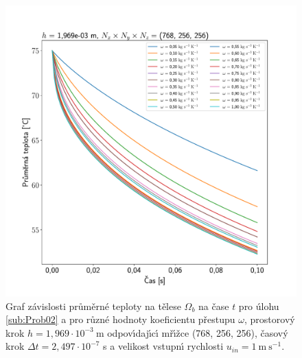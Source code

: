         
        \begin{figure}[H]
            \centering
            \includegraphics[width=.95\linewidth, clip, trim=1.45cm 0.95cm 2cm 1.7cm]{Img/Kapitola 3/Problem02_all_transfers.pdf}
            \caption{Graf z\'{a}vislosti pr\r{u}m\v{e}rn\'{e} teploty na t\v{e}lese $\Omega_b$ na \v{c}ase $t$ pro \'{u}lohu \ref{sub:Prob02} a pro r\r{u}zn\'{e} hodnoty koeficientu p\v{r}estupu $\omega$, prostorov\'{y} krok $h = 1{,}969\cdot 10^{-3} \ \mathrm{m}$ odpov\'{\i}daj\'{\i}c\'{\i} m\v{r}\'{\i}\v{z}ce (768, 256, 256), \v{c}asov\'{y} krok $\Delta t =  2{,}497 \cdot 10^{-7}$ s a velikost vstupn\'{\i} rychlosti $u_{in} = 1 \ \mathrm{m \ s^{-1}}$. }
            \label{fig:Prob05_diff_h}
        \end{figure}

